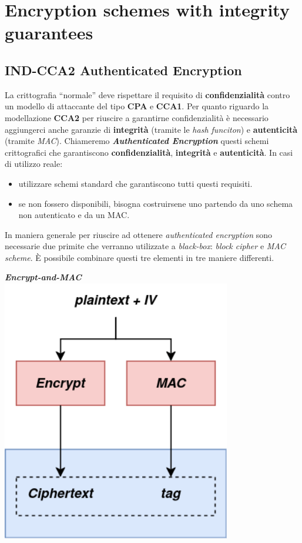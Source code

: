 \chapter{Encryption schemes with integrity guarantees}

\section{IND-CCA2 Authenticated Encryption}

\begin{flushleft}
    La crittografia ``normale'' deve rispettare il requisito di \textbf{confidenzialità} contro un modello di attaccante del tipo \textbf{CPA} e \textbf{CCA1}. Per quanto riguardo la modellazione \textbf{CCA2} per riuscire a garantirne confidenzialità è necessario aggiungerci anche garanzie di \textbf{integrità} (tramite le \textit{hash funciton}) e \textbf{autenticità} (tramite \textit{MAC}). Chiameremo \textbf{\textit{Authenticated Encryption}} questi schemi crittografici che garantiscono \textbf{confidenzialità}, \textbf{integrità} e \textbf{autenticità}. In casi di utilizzo reale:
    \begin{itemize}[nosep]
        \item utilizzare schemi standard che garantiscono tutti questi requisiti.
        \item se non fossero disponibili, bisogna costruirsene uno partendo da uno schema non autenticato e da un MAC.
    \end{itemize}

    In maniera generale per riuscire ad ottenere \textit{authenticated encryption} sono necessarie due primite che verranno utilizzate a \textit{black-box}: \textit{block cipher} e \textit{MAC scheme}. È possibile combinare questi tre elementi in tre maniere differenti.

    {\centering
        \begin{minipage}[c]{0.30\textwidth}
            \centering
            \textbf{\textit{Encrypt-and-MAC}} \\
            \includegraphics[width=0.75\textwidth]{img/enc_and_mac.png}
            

\end{minipage}}
\end{flushleft}
